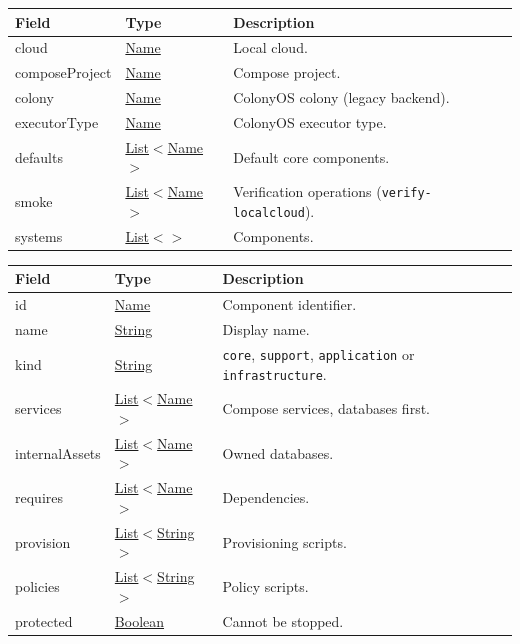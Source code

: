 \documentclass[a4paper]{arrowhead}
\newcommand{\mref}[2][]{{\textcolor{ArrowheadPurple}{\hyperref[sec:model:#2]{\ifstrempty{#1}{#2}{#1}}}}}
\newcommand{\pref}[1]{{\textcolor{ArrowheadGrey}{\hyperref[sec:model:primitives:#1]{#1}}}}
\begin{document}
\noindent\begin{tabularx}{\textwidth}{| >{\raggedright\arraybackslash}p{3.6cm} | >{\raggedright\arraybackslash\small}p{4.4cm} | X |} \hline
\rowcolor{gray!33} Field & Type & Description \\ \hline
cloud & \pref{Name} & Local cloud. \\ \hline
composeProject & \pref{Name} & Compose project. \\ \hline
colony & \pref{Name} & ColonyOS colony (legacy backend). \\ \hline
executorType & \pref{Name} & ColonyOS executor type. \\ \hline
defaults & \pref{List}$<$\pref{Name}$>$ & Default core components. \\ \hline
smoke & \pref{List}$<$\pref{Name}$>$ & Verification operations (\texttt{verify-localcloud}). \\ \hline
systems & \pref{List}$<$\mref{Component}$>$ & Components. \\ \hline
\end{tabularx}


\noindent\begin{tabularx}{\textwidth}{| >{\raggedright\arraybackslash}p{3.6cm} | >{\raggedright\arraybackslash\small}p{4.4cm} | X |} \hline
\rowcolor{gray!33} Field & Type & Description \\ \hline
id & \pref{Name} & Component identifier. \\ \hline
name & \pref{String} & Display name. \\ \hline
kind & \pref{String} & \texttt{core}, \texttt{support}, \texttt{application} or \texttt{infrastructure}. \\ \hline
services & \pref{List}$<$\pref{Name}$>$ & Compose services, databases first. \\ \hline
internalAssets & \pref{List}$<$\pref{Name}$>$ & Owned databases. \\ \hline
requires & \pref{List}$<$\pref{Name}$>$ & Dependencies. \\ \hline
provision & \pref{List}$<$\pref{String}$>$ & Provisioning scripts. \\ \hline
policies & \pref{List}$<$\pref{String}$>$ & Policy scripts. \\ \hline
protected & \pref{Boolean} & Cannot be stopped. \\ \hline
\end{tabularx}

\end{document}
